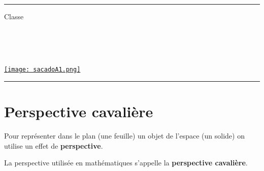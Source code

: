 \documentclass[a4paper,dvipsnames]{article}
\begin{document}

\fancyhead[C]{}
\hrule\medskip %
\begin{minipage}{0.295\textwidth} 
\raggedright
Classe \myClasse \hfill\\
\myDiscipline \hfill\\
\myParcours \hfill\\
\end{minipage}
\begin{minipage}{0.4\textwidth} 
\centering 
\scshape\huge
\textcolor{sacado_purple}{\myTitle} \\ 
\normalsize 
\end{minipage}
\begin{minipage}{0.295\textwidth} 
\raggedleft
\href{https://sacado.xyz/}{\texttt{[image: sacadoA1.png]}}
\end{minipage}
\medskip \hrule
\bigskip


%

\section{Perspective cavalière}

\begin{Def}
Pour représenter dans le plan (une feuille) un objet de l'espace (un solide) on utilise un effet de \textbf{perspective}.

La perspective utilisée en mathématiques s'appelle la \textbf{perspective cavalière}.
\end{Def}
\end{document}
